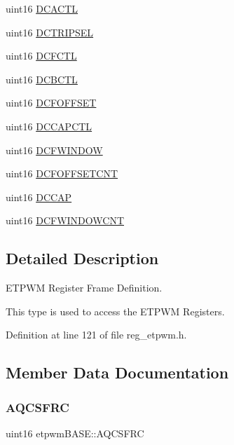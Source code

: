 \begin{DoxyCompactItemize}
\item 
uint16 \mbox{\hyperlink{structetpwmBASE_a99a9d823297a439d3794870aabec3f84}{D\+C\+A\+C\+TL}}
\item 
uint16 \mbox{\hyperlink{structetpwmBASE_aebf72a38aa25097ac6d7a8b20b314a90}{D\+C\+T\+R\+I\+P\+S\+EL}}
\item 
uint16 \mbox{\hyperlink{structetpwmBASE_a48daa3c3dd45dde65f8a9cdc0409ce26}{D\+C\+F\+C\+TL}}
\item 
uint16 \mbox{\hyperlink{structetpwmBASE_ad52e60bb14aad413a988aaea1930af53}{D\+C\+B\+C\+TL}}
\item 
uint16 \mbox{\hyperlink{structetpwmBASE_ac1ffacf30f5476825f12bfee42f70c18}{D\+C\+F\+O\+F\+F\+S\+ET}}
\item 
uint16 \mbox{\hyperlink{structetpwmBASE_a971e8e616f876606dc0c02ca7d0d20b4}{D\+C\+C\+A\+P\+C\+TL}}
\item 
uint16 \mbox{\hyperlink{structetpwmBASE_afa47b60389f0f31b26f6a348c6638823}{D\+C\+F\+W\+I\+N\+D\+OW}}
\item 
uint16 \mbox{\hyperlink{structetpwmBASE_a3c5ac0ffaa3345df270b8c636be2c5b3}{D\+C\+F\+O\+F\+F\+S\+E\+T\+C\+NT}}
\item 
uint16 \mbox{\hyperlink{structetpwmBASE_a67c1232483347bde0639a3595bcbbb18}{D\+C\+C\+AP}}
\item 
uint16 \mbox{\hyperlink{structetpwmBASE_a7f1f5cc983c7c84b248c078b7146c2ce}{D\+C\+F\+W\+I\+N\+D\+O\+W\+C\+NT}}
\end{DoxyCompactItemize}


\subsection{Detailed Description}
E\+T\+P\+WM Register Frame Definition. 

This type is used to access the E\+T\+P\+WM Registers. 

Definition at line 121 of file reg\+\_\+etpwm.\+h.



\subsection{Member Data Documentation}
\mbox{\label{structetpwmBASE_a99f88930da74ae9b288f85f5cc6d3eb4}} 
\subsubsection{\texorpdfstring{A\+Q\+C\+S\+F\+RC}{AQCSFRC}}
{\footnotesize\ttfamily uint16 etpwm\+B\+A\+S\+E\+::\+A\+Q\+C\+S\+F\+RC}

